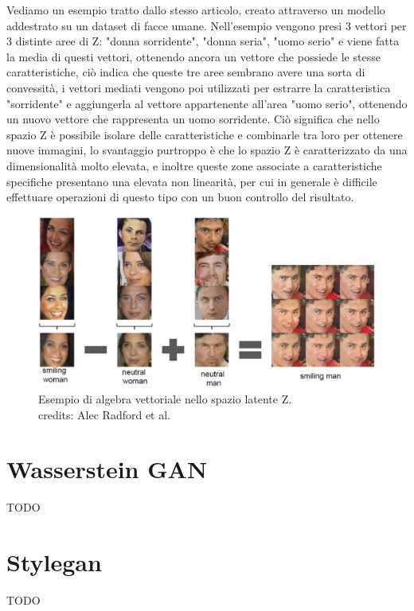 Vediamo un esempio tratto dallo stesso articolo, creato attraverso un modello addestrato su un dataset di facce umane.
Nell'esempio vengono presi 3 vettori per 3 distinte aree di Z: "donna sorridente", "donna seria", "uomo serio" e viene fatta la media 
di questi vettori, ottenendo ancora un vettore che possiede le stesse caratteristiche, ciò indica che queste tre aree sembrano avere una sorta di 
convessità, i vettori mediati vengono poi utilizzati per estrarre la caratteristica "sorridente" e aggiungerla al vettore appartenente all'area "uomo serio",
ottenendo un nuovo vettore che rappresenta un uomo sorridente.
Ciò significa che nello spazio Z è possibile isolare delle caratteristiche e combinarle tra loro per ottenere nuove immagini, lo svantaggio purtroppo
è che lo spazio Z è caratterizzato da una dimensionalità molto elevata, e inoltre queste zone associate a caratteristiche specifiche presentano una elevata
non linearità, per cui in generale è difficile effettuare operazioni di questo tipo con un buon controllo del risultato.

    \begin{figure}[H]
        \centering
        \includegraphics[width=1.0\textwidth]{imgs/DCGAN_vectorial_algebra.png}
        \caption{Esempio di algebra vettoriale nello spazio latente Z.\\
        credits: Alec Radford et al. \cite{radford2016unsupervised}}
        \label{fig:DCGAN_vectorial_algebra}
    \end{figure}
\section{Wasserstein GAN}
TODO
\section{Stylegan}
TODO



